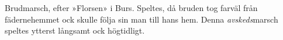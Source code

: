 Brudmarsch, efter »Florsen» i Burs. Speltes, då bruden tog farväl från fädernehemmet
ock skulle följa sin man till hans hem. Denna \textit{avskeds}marsch speltes ytterst långsamt ock högtidligt.